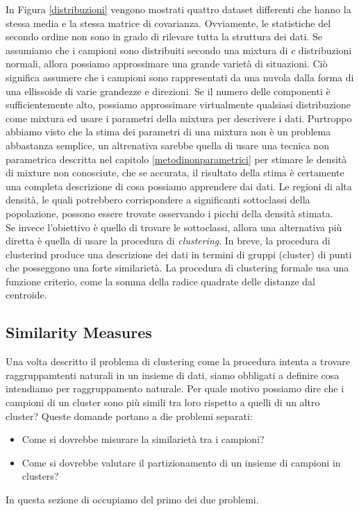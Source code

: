 In Figura \ref{distribuzioni} vengono mostrati quattro dataset differenti che hanno la stessa media e la stessa matrice di covarianza. Ovviamente, le statistiche del secondo ordine non sono in grado di rilevare tutta la struttura dei dati. Se assumiamo che i campioni sono distribuiti secondo una mixtura di $c$ distribuzioni normali, allora possiamo approssimare una grande varietà di situazioni. Ciò significa assumere che i campioni sono rappresentati da una nuvola dalla forma di una ellissoide di varie grandezze e direzioni. Se il numero delle componenti è sufficientemente alto, possiamo approssimare virtualmente qualsiasi distribuzione come mixtura ed usare i parametri della mixtura per descrivere i dati. Purtroppo abbiamo visto che la stima dei parametri di una mixtura non è un problema abbastanza semplice, un altrenativa sarebbe quella di usare una tecnica non parametrica descritta nel capitolo \ref{metodinonparametrici} per stimare le densità di mixture non conosciute, che se accurata, il risultato della stima è certamente una completa descrizione di cosa possiamo apprendere dai dati. Le regioni di alta densità, le quali potrebbero corrispondere a significanti sottoclassi della popolazione, possono essere trovate osservando i picchi della densità stimata.\\

\noindent Se invece l'obiettivo è quello di trovare le sottoclassi, allora una alternativa più diretta è quella di usare la procedura di \emph{clustering}. In breve, la procedura di clusterind produce una descrizione dei dati in termini di gruppi (cluster) di punti che posseggono una forte similarietà. La procedura di clustering formale usa una funzione criterio, come la somma della radice quadrate delle distanze dal centroide. 

\subsection{Similarity Measures}
Una volta descritto il problema di clustering come la procedura intenta a trovare raggruppamtenti  naturali in un insieme di dati, siamo obbligati a definire cosa intendiamo per raggruppamento naturale. Per quale motivo possiamo dire che i campioni di un cluster sono più simili tra loro rispetto a quelli di un altro cluster? Queste domande portano a die problemi separati:
\begin{itemize}
\item Come si dovrebbe misurare la similarietà tra i campioni?
\item Come si dovrebbe valutare il partizionamento di un insieme di campioni in clusters?
\end{itemize}
In questa sezione di occupiamo del primo dei due problemi.\\

